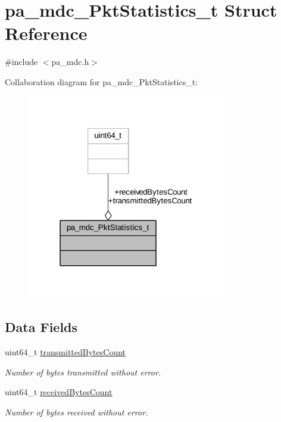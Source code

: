 \hypertarget{structpa__mdc___pkt_statistics__t}{}\section{pa\+\_\+mdc\+\_\+\+Pkt\+Statistics\+\_\+t Struct Reference}
\label{structpa__mdc___pkt_statistics__t}


{\ttfamily \#include $<$pa\+\_\+mdc.\+h$>$}



Collaboration diagram for pa\+\_\+mdc\+\_\+\+Pkt\+Statistics\+\_\+t\+:
\nopagebreak
\begin{figure}[H]
\begin{center}
\leavevmode
\includegraphics[width=247pt]{structpa__mdc___pkt_statistics__t__coll__graph}
\end{center}
\end{figure}
\subsection*{Data Fields}
\begin{DoxyCompactItemize}
\item 
uint64\+\_\+t \hyperlink{structpa__mdc___pkt_statistics__t_aaf16be86f6d023de1e9a85089f0974d8}{transmitted\+Bytes\+Count}
\begin{DoxyCompactList}\small\item\em Number of bytes transmitted without error. \end{DoxyCompactList}\item 
uint64\+\_\+t \hyperlink{structpa__mdc___pkt_statistics__t_a7ca7d816486c7c6ba12087fcc7c3c284}{received\+Bytes\+Count}
\begin{DoxyCompactList}\small\item\em Number of bytes received without error. \end{DoxyCompactList}\end{DoxyCompactItemize}


